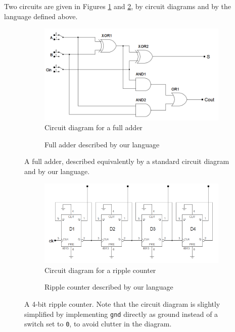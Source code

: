 Two circuits are given in Figures \ref{fig:example1} and \ref{fig:example2},
by circuit diagrams and by the language defined above. 

\begin{figure}[htbp]
  \begin{subfigure}{\textwidth}
    \centering
    \includegraphics[scale=.33]{examples/fulladder.png}
    \caption{Circuit diagram for a full adder}
  \end{subfigure}
  \begin{subfigure}{\textwidth}
    
    \caption{Full adder described by our language}
  \end{subfigure}
  \caption{A full adder, described equivalently by a standard circuit
    diagram and by our language.}
  \label{fig:example1}
\end{figure}

\begin{figure}[htbp]
  \begin{subfigure}{\textwidth}
    \centering
    \includegraphics[scale=.33]{examples/ripplecounter.png}
    \caption{Circuit diagram for a ripple counter}
  \end{subfigure}
  \begin{subfigure}{\textwidth}
    
    \caption{Ripple counter described by our language}
  \end{subfigure}
  \caption{A 4-bit ripple counter. Note that the circuit diagram is
    slightly simplified by implementing \texttt{gnd} directly as
    ground instead of a switch set to \texttt{0}, to avoid clutter
    in the diagram.}
  \label{fig:example2}
\end{figure}
\clearpage %
